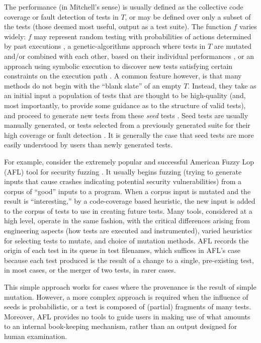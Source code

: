\documentclass[final]{article}
\begin{document}
The performance (in Mitchell's sense) is usually defined as the
collective code coverage or fault detection of tests in $T$, or may be
defined over only a subset of the tests (those deemed most useful,
output as a test suite).  The function $f$ varies widely: $f$ may
represent random testing with probabilities of actions determined by
past executions \cite{AndrewsL07}, a genetic-algorithms approach where
tests in $T$ are mutated and/or combined with each other, based on
their individual performances
\cite{McMinn04search-basedsoftware,FA11,aflfuzz}, or an approach using
symbolic execution to discover new tests satisfying certain
constraints on the execution path \cite{Whitebox,GodefroidKS05,KLEE}.
A common feature however, is that many methods do not begin with the
``blank slate'' of an empty $T$.  Instead, they take as an initial
input a population of tests that are thought to be high-quality (and,
most importantly, to provide some guidance as to the structure of
valid tests), and proceed to generate new tests from these \emph{seed}
tests
\cite{aflfuzz,Person:2011:DIS:1993498.1993558,Marinescu:2012:MTS:2337223.2337308,issta14,STVR_seeding}.
Seed tests are usually manually generated, or tests selected from a
previously generated suite for their high coverage or fault detection
\cite{YooHarman,stvrcausereduce}.  It is generally the case that seed
tests are more easily understood by users than newly generated tests.

For example, consider the extremely popular and successful American
Fuzzy Lop (AFL) tool
for security fuzzing \cite{aflfuzz}.  It usually begins fuzzing
(trying to generate inputs that cause crashes indicating potential
security vulnerabilities) from a corpus of ``good'' inputs to a
program.  When a corpus input is mutated and the result is
``interesting,'' by a code-coverage based heuristic, the new input is
added to the corpus of tests to use in creating future tests.  Many
tools, considered at a high level, operate in the same fashion, with the
critical differences arising from engineering aspects (how tests are executed
and instrumented), varied heuristics for selecting tests to mutate,
and choice of mutation methods.  AFL records the origin of each test
in its queue in test filenames, which suffices in AFL's case because
each test produced is the result of a change to a single, pre-existing
test, in most cases, or the merger of two tests, in rarer cases.

This simple approach works for cases where the provenance is the
result of simple mutation.  However, a more complex approach is
required when the influence of seeds is probabilistic, or a test is
composed of (partial) fragments of many tests.  Moreover, AFL provides
no tools to guide users in making use of what amounts to an internal
book-keeping mechanism, rather than an output designed for human
examination.
\end{document}
